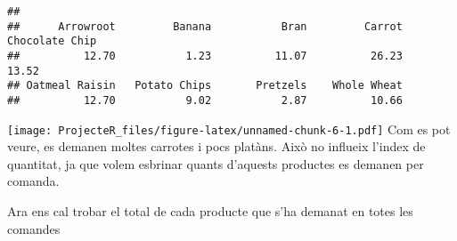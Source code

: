 \documentclass[
]{article}
\newenvironment{Shaded}{\begin{snugshade}}{\end{snugshade}}
\newcommand{\AttributeTok}[1]{\textcolor[rgb]{0.77,0.63,0.00}{#1}}
\newcommand{\CommentTok}[1]{\textcolor[rgb]{0.56,0.35,0.01}{\textit{#1}}}
\newcommand{\DecValTok}[1]{\textcolor[rgb]{0.00,0.00,0.81}{#1}}
\newcommand{\FunctionTok}[1]{\textcolor[rgb]{0.00,0.00,0.00}{#1}}
\newcommand{\NormalTok}[1]{#1}
\newcommand{\OtherTok}[1]{\textcolor[rgb]{0.56,0.35,0.01}{#1}}
\newcommand{\SpecialCharTok}[1]{\textcolor[rgb]{0.00,0.00,0.00}{#1}}
\newcommand{\StringTok}[1]{\textcolor[rgb]{0.31,0.60,0.02}{#1}}
\begin{document}
\begin{verbatim}
## 
##      Arrowroot         Banana           Bran         Carrot Chocolate Chip 
##          12.70           1.23          11.07          26.23          13.52 
## Oatmeal Raisin   Potato Chips       Pretzels    Whole Wheat 
##          12.70           9.02           2.87          10.66
\end{verbatim}

\begin{Shaded}
\end{Shaded}

\texttt{[image: ProjecteR\_files/figure-latex/unnamed-chunk-6-1.pdf]} Com
es pot veure, es demanen moltes carrotes i pocs platàns. Això no
influeix l'index de quantitat, ja que volem esbrinar quants d'aquests
productes es demanen per comanda.

Ara ens cal trobar el total de cada producte que s'ha demanat en totes
les comandes
\end{document}
